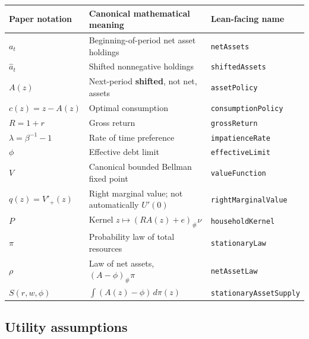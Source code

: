 \documentclass[
  11pt,
]{article}
\begin{document}
{\def\LTcaptype{} %
\begin{longtable}[]{@{}
  >{\raggedright\arraybackslash}p{}
  >{\raggedright\arraybackslash}p{}
  >{\raggedright\arraybackslash}p{}@{}}
\toprule\noalign{}
\begin{minipage}[b]{\linewidth}\raggedright
Paper notation
\end{minipage} & \begin{minipage}[b]{\linewidth}\raggedright
Canonical mathematical meaning
\end{minipage} & \begin{minipage}[b]{\linewidth}\raggedright
Lean-facing name
\end{minipage} \\
\midrule\noalign{}
\endhead
\bottomrule\noalign{}
\endlastfoot
\(a_t\) & Beginning-of-period net asset holdings & \texttt{netAssets} \\
\(\widehat a_t\) & Shifted nonnegative holdings &
\texttt{shiftedAssets} \\
\(A(z)\) & Next-period \textbf{shifted}, not net, assets &
\texttt{assetPolicy} \\
\(c(z)=z-A(z)\) & Optimal consumption & \texttt{consumptionPolicy} \\
\(R=1+r\) & Gross return & \texttt{grossReturn} \\
\(\lambda=\beta^{-1}-1\) & Rate of time preference &
\texttt{impatienceRate} \\
\(\phi\) & Effective debt limit & \texttt{effectiveLimit} \\
\(V\) & Canonical bounded Bellman fixed point &
\texttt{valueFunction} \\
\(q(z)=V'_+(z)\) & Right marginal value; not automatically \(U'(0)\) &
\texttt{rightMarginalValue} \\
\(P\) & Kernel \(z\mapsto(RA(z)+e)_\#\nu\) & \texttt{householdKernel} \\
\(\pi\) & Probability law of total resources & \texttt{stationaryLaw} \\
\(\rho\) & Law of net assets, \((A-\phi)_\#\pi\) &
\texttt{netAssetLaw} \\
\(S(r,w,\phi)\) & \(\int(A(z)-\phi)\,d\pi(z)\) &
\texttt{stationaryAssetSupply} \\
\end{longtable}
}

\subsection{Utility assumptions}\label{utility-assumptions}
\end{document}
